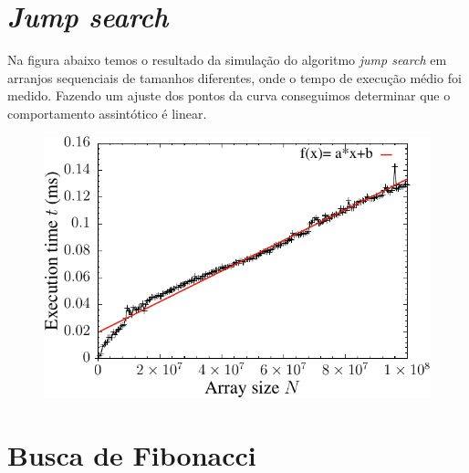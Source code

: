 \section{{\it Jump search}}

Na figura abaixo temos o resultado da simulação do algoritmo {\it jump search} em arranjos sequenciais de tamanhos diferentes, onde o tempo de execução médio foi medido. Fazendo um ajuste dos pontos da curva conseguimos determinar que o comportamento assintótico é linear.
\begin{figure}[H]
  \centering
  \includegraphics[scale=1.2]{../plots/jumpsearch_time.pdf}
\end{figure} \label{fig:jumpsearch_time}

\section{Busca de Fibonacci}
